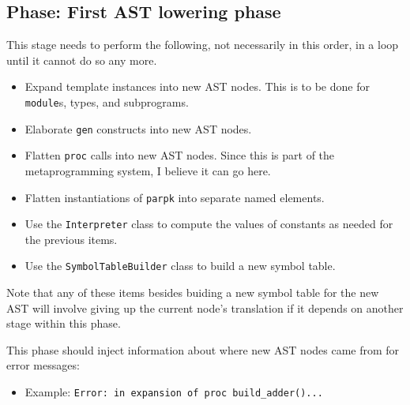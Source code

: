 \documentclass{article}
\begin{document}
	\subsection{Phase:  First AST lowering phase}
		This stage needs to perform the following, not necessarily in this
		order, in a loop until it cannot do so any more.
		\begin{itemize}
		\item Expand template instances into new AST nodes.  This is to
			be done for \texttt{module}s, types, and subprograms.
		\item Elaborate \texttt{gen} constructs into new AST nodes.
		\item Flatten \texttt{proc} calls into new AST nodes.  Since
			this is part of the metaprogramming system, I believe it
			can go here.
		\item Flatten instantiations of \texttt{parpk} into separate named
			elements.
		\item Use the \texttt{Interpreter} class to compute the values of
			constants as needed for the previous items.
		\item Use the \texttt{SymbolTableBuilder} class to build a new
			symbol table.
		\end{itemize}
		Note that any of these items besides buiding a new symbol table for
		the new AST will involve giving up the current node's translation
		if it depends on another stage within this phase.


		This phase should inject information about where new AST nodes came
		from for error messages:
		\begin{itemize}
		\item Example:  \texttt{Error:  in expansion of proc
			build\_adder()...}
		\end{itemize}


\end{document}
